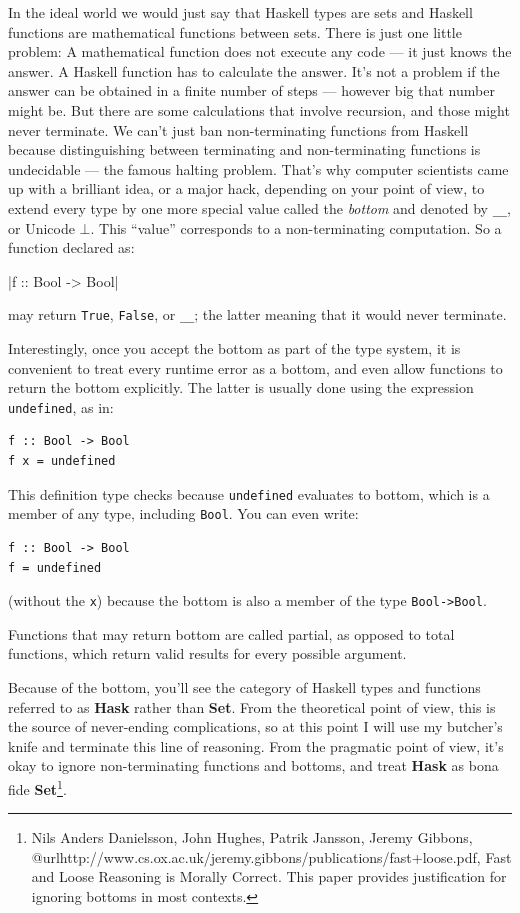 In the ideal world we would just say that Haskell types are sets and
Haskell functions are mathematical functions between sets. There is just
one little problem: A mathematical function does not execute any code
--- it just knows the answer. A Haskell function has to calculate the
answer. It's not a problem if the answer can be obtained in a finite
number of steps --- however big that number might be. But there are some
calculations that involve recursion, and those might never terminate. We
can't just ban non-terminating functions from Haskell because
distinguishing between terminating and non-terminating functions is
undecidable --- the famous halting problem. That's why computer
scientists came up with a brilliant idea, or a major hack, depending on
your point of view, to extend every type by one more special value
called the \emph{bottom} and denoted by \texttt{\_\textbar{}\_}, or
Unicode \ensuremath{\bot}. This ``value'' corresponds to a non-terminating computation.
So a function declared as:

|f :: Bool -> Bool|

may return \texttt{True}, \texttt{False}, or \texttt{\_\textbar{}\_};
the latter meaning that it would never terminate.

Interestingly, once you accept the bottom as part of the type system, it
is convenient to treat every runtime error as a bottom, and even allow
functions to return the bottom explicitly. The latter is usually done
using the expression \texttt{undefined}, as in:

\begin{verbatim}
f :: Bool -> Bool
f x = undefined
\end{verbatim}

This definition type checks because \texttt{undefined} evaluates to
bottom, which is a member of any type, including \texttt{Bool}. You can
even write:

\begin{verbatim}
f :: Bool -> Bool
f = undefined
\end{verbatim}

(without the \texttt{x}) because the bottom is also a member of the type
\texttt{Bool->Bool}.

Functions that may return bottom are called partial, as opposed to total
functions, which return valid results for every possible argument.

Because of the bottom, you'll see the category of Haskell types and
functions referred to as \textbf{Hask} rather than \textbf{Set}. From
the theoretical point of view, this is the source of never-ending
complications, so at this point I will use my butcher's knife and
terminate this line of reasoning. From the pragmatic point of view, it's
okay to ignore non-terminating functions and bottoms, and treat
\textbf{Hask} as bona fide \textbf{Set}\footnote{Nils Anders Danielsson,
John Hughes, Patrik Jansson, Jeremy Gibbons, @url{http://www.cs.ox.ac.uk/jeremy.gibbons/publications/fast+loose.pdf,
Fast and Loose Reasoning is Morally Correct}. This paper provides justification for ignoring bottoms in most contexts.}.


